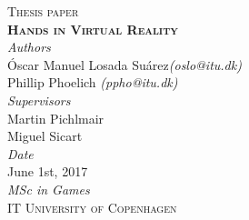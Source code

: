 \begin{titlepage}
\begin{center}

\textsc{\large Thesis paper}\\[2cm]

\textsc{\huge \textbf{Hands in Virtual Reality}}\\[8.2cm]

\textit{Authors}\\
Óscar Manuel Losada Suárez\textit{(oslo@itu.dk)}\\
Phillip Phoelich \textit{(ppho@itu.dk)}\\[1cm]

\textit{Supervisors}\\
Martin Pichlmair\\
Miguel Sicart\\[1cm]

\textit{Date}\\
June 1st, 2017\\

\vfill
\textit{MSc in Games}\\
\textsc{IT University of Copenhagen}

\end{center}
\end{titlepage}

\restoregeometry